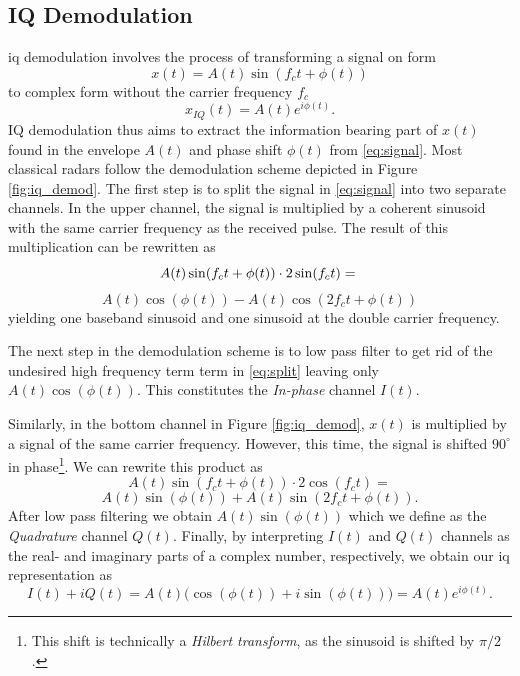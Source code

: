 
\begin{appendices}

\chapter{IQ Demodulation}\label{apx:iq}

\gls{iq} demodulation involves the process of transforming a signal on form 
\begin{equation}\label{eq:signal}
	x(t)=A(t)\sin(f_c t+\phi(t))
\end{equation}
to complex form without the carrier frequency $f_c$ \citep{lee_1991}
\begin{equation}
	x_{IQ}(t) = A(t)e^{i\phi(t)}.
\end{equation}
IQ demodulation thus aims to extract the information bearing part of $x(t)$ found in the envelope $A(t)$ and phase shift $\phi(t)$ from \eqref{eq:signal}. Most classical radars follow the demodulation scheme depicted in Figure \ref{fig:iq_demod}. The first step is to split the signal in \eqref{eq:signal} into two separate channels. In the upper channel, the signal is multiplied by a coherent sinusoid with the same carrier frequency as the received pulse. The result of this multiplication can be rewritten as
\begin{equation}
	 A(t)\sin(f_c t+\phi(t))\cdot 2\sin(f_c t) = \\
\end{equation}
\begin{equation}\label{eq:split}
	A(t)\cos(\phi(t))-A(t)\cos(2f_c t+\phi(t))
\end{equation}
yielding one baseband sinusoid and one sinusoid at the double carrier frequency. 

The next step in the demodulation scheme is to low pass filter to get rid of the undesired high frequency term term in \eqref{eq:split} leaving only $A(t)\cos(\phi(t))$. This constitutes the \emph{In-phase} channel $I(t)$.

Similarly, in the bottom channel in Figure \ref{fig:iq_demod}, $x(t)$ is multiplied by a signal of the same carrier frequency. However, this time, the signal is shifted $90^\circ$ in phase\footnote{This shift is technically a \emph{Hilbert transform}, as the sinusoid is shifted by $\pi/2$.}. We can rewrite this product as
\begin{equation}
	 A(t)\sin(f_c t+\phi(t))\cdot 2\cos(f_c t) = 
\end{equation}
\begin{equation}\label{eq:split2}
 	 A(t)\sin(\phi(t))+A(t)\sin(2f_c t+\phi(t)).
\end{equation}
After low pass filtering we obtain $A(t)\sin(\phi(t))$ which we define as the \emph{Quadrature} channel $Q(t)$. Finally, by interpreting $I(t)$ and $Q(t)$ channels as the real- and imaginary parts of a complex number, respectively, we obtain our \gls{iq} representation as
\begin{equation}
	I(t)+iQ(t)=A(t)\Big(\cos(\phi(t))+i\sin(\phi(t))\Big)=A(t)e^{i\phi(t)}.
\end{equation}


\end{appendices}

